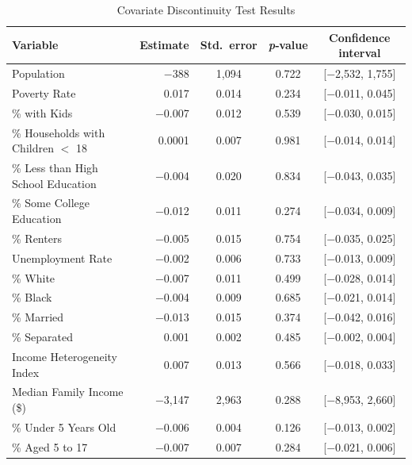 \begin{table}[!h]
    \centering
    \caption{Covariate Discontinuity Test Results}
    \label{tab:covariate_discontinuity}
    \begin{tabularx}{\textwidth}{p{5cm}rccc}
        \hline
        Variable & Estimate & Std.~error & \textit{p}‐value & Confidence interval \\
        \hline
        Population                                    &  $-$388  & 1,094 & 0.722 & [$-$2,532, 1,755] \\
        Poverty Rate                                  &   0.017  & 0.014 & 0.234 & [$-$0.011, 0.045] \\
        \% with Kids                                  &  $-$0.007 & 0.012 & 0.539 & [$-$0.030, 0.015] \\
        \% Households with Children $<$ 18            &  0.0001 & 0.007 & 0.981 & [$-$0.014, 0.014] \\
        \% Less than High School Education            &  $-$0.004 & 0.020 & 0.834 & [$-$0.043, 0.035] \\
        \% Some College Education                     &  $-$0.012 & 0.011 & 0.274 & [$-$0.034, 0.009] \\
        \% Renters                                    &  $-$0.005 & 0.015 & 0.754 & [$-$0.035, 0.025] \\
        Unemployment Rate                             &  $-$0.002 & 0.006 & 0.733 & [$-$0.013, 0.009] \\
        \% White                                      &  $-$0.007 & 0.011 & 0.499 & [$-$0.028, 0.014] \\
        \% Black                                      &  $-$0.004 & 0.009 & 0.685 & [$-$0.021, 0.014] \\
        \% Married                                    &  $-$0.013 & 0.015 & 0.374 & [$-$0.042, 0.016] \\
        \% Separated                                  &   0.001  & 0.002 & 0.485 & [$-$0.002, 0.004] \\
        Income Heterogeneity Index                    &   0.007  & 0.013 & 0.566 & [$-$0.018, 0.033] \\
        Median Family Income (\$)                     & $-$3,147 & 2,963 & 0.288 & [$-$8,953, 2,660] \\
        \% Under 5 Years Old                          &  $-$0.006 & 0.004 & 0.126 & [$-$0.013, 0.002] \\
        \% Aged 5 to 17                               &  $-$0.007 & 0.007 & 0.284 & [$-$0.021, 0.006] \\

\end{tabularx}
\end{table}
